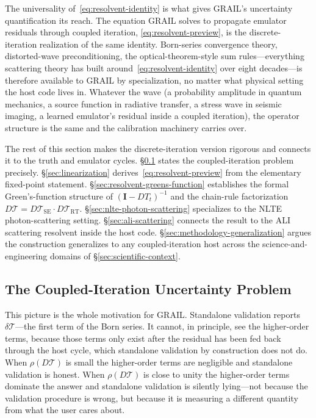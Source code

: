 \documentclass[11pt]{article}
\newcommand{\Tcyc}{\mathcal{T}}
\newcommand{\Trt}{\Tcyc_{\mathrm{RT}}}
\newcommand{\Tse}{\Tcyc_{\mathrm{SE}}}
\begin{document}
The universality of~\eqref{eq:resolvent-identity} is what gives
GRAIL's uncertainty quantification its reach.  The equation GRAIL
solves to propagate emulator residuals through coupled iteration,
\eqref{eq:resolvent-preview}, is the discrete-iteration realization
of the same identity.  Born-series convergence theory, distorted-wave
preconditioning, the optical-theorem-style sum rules---everything
scattering theory has built around~\eqref{eq:resolvent-identity}
over eight decades---is therefore available to GRAIL by
specialization, no matter what physical setting the host code lives
in.  Whatever the wave (a probability amplitude in quantum mechanics,
a source function in radiative transfer, a stress wave in seismic
imaging, a learned emulator's residual inside a coupled iteration),
the operator structure is the same and the calibration machinery
carries over.

The rest of this section makes the discrete-iteration version
rigorous and connects it to the truth and emulator cycles.
\S\ref{sec:coupled-iter-problem} states the coupled-iteration
problem precisely.
\S\ref{sec:linearization} derives~\eqref{eq:resolvent-preview} from
the elementary fixed-point statement.
\S\ref{sec:resolvent-greens-function} establishes the formal
Green's-function structure of $(\mathbf{I} - DT_t)^{-1}$ and the
chain-rule factorization $D\Tcyc = D\Tse \cdot D\Trt$.
\S\ref{sec:nlte-photon-scattering} specializes to the NLTE
photon-scattering setting.
\S\ref{sec:ali-scattering} connects the result to the ALI scattering
resolvent inside the host code.
\S\ref{sec:methodology-generalization} argues the construction
generalizes to any coupled-iteration host across the
science-and-engineering domains of \S\ref{sec:scientific-context}.

\subsection{The Coupled-Iteration Uncertainty Problem}
\label{sec:coupled-iter-problem}

This picture is the whole motivation for GRAIL.  Standalone
validation reports $\delta\mathcal{T}$---the first term of the Born
series.  It cannot, in principle, see the higher-order terms,
because those terms only exist after the residual has been fed back
through the host cycle, which standalone validation by construction
does not do.  When $\rho(D\Tcyc)$ is small the higher-order terms are
negligible and standalone validation is honest.  When $\rho(D\Tcyc)$
is close to unity the higher-order terms dominate the answer and
standalone validation is silently lying---not because the validation
procedure is wrong, but because it is measuring a different quantity
from what the user cares about.
\end{document}
